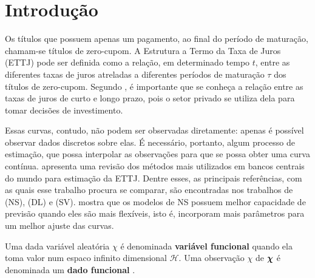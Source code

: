\documentclass[
	12pt,				%
	openright,			%
	oneside,			%
	a4paper,			%
	english,			%
	brazil				%
	]{dissertacao-ufrgs-abntex2}
\begin{document}
\tableofcontents*
\cleardoublepage



\textual

\chapter*[Introdução]{Introdução}


Os títulos que possuem apenas um pagamento, ao final do período de
maturação, chamam-se títulos de zero-cupom. A Estrutura a Termo da
Taxa de Juros (ETTJ) pode ser definida como a relação, em determinado tempo $t$, entre as diferentes taxas de juros atreladas
a diferentes períodos de maturação $\tau$ dos títulos de zero-cupom.
Segundo , é importante que se conheça a relação
entre as taxas de juros de curto e longo prazo, pois o setor privado
se utiliza dela para tomar decisões de investimento.

Essas curvas, contudo, não podem ser observadas diretamente: apenas é possível
observar dados discretos sobre elas. É necessário, portanto, algum
processo de estimação, que possa interpolar as observações para que
se possa obter uma curva contínua.   apresenta
uma revisão dos métodos mais utilizados em bancos centrais do mundo
para estimação da ETTJ. Dentre esses, as principais referências, com
as quais esse trabalho procura se comparar, são encontradas nos trabalhos 
de (NS), 
(DL) e (SV).
 mostra que os modelos de NS possuem
melhor capacidade de previsão quando eles são mais flexíveis, isto é, incorporam mais parâmetros para um melhor ajuste das curvas.


Uma dada variável aleatória $\chi$ é denominada \textbf{variável
funcional }quando ela toma valor num espaco infinito dimensional $\mathcal{H}$.
Uma observação $\chi$ de $\mathcal{\boldsymbol{\chi}}$ é denominada um \textbf{dado
funcional} \cite{vieu_nonparametric_2006}.
\end{document}
